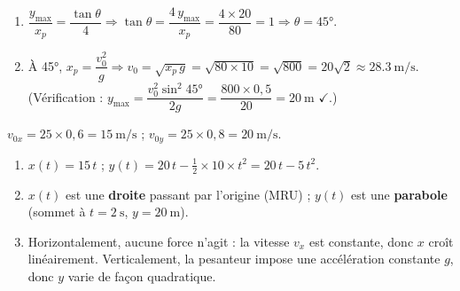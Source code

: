 \documentclass[11pt,a4paper]{article}
\begin{document}
\begin{corrige}
\begin{enumerate}[label=\alph*)]
  \item $\dfrac{y_{\max}}{x_p}=\dfrac{\tan\theta}{4}\Rightarrow \tan\theta=\dfrac{4\,y_{\max}}{x_p}=\dfrac{4\times20}{80}=1 \Rightarrow \theta=\ang{45}$.
  \item À \ang{45}, $x_p=\dfrac{v_0^2}{g}\Rightarrow v_0=\sqrt{x_p\,g}=\sqrt{80\times10}=\sqrt{800}=20\sqrt2\approx\qty{28,3}{\metre\per\second}$.
        (Vérification : $y_{\max}=\dfrac{v_0^2\sin^2\ang{45}}{2g}=\dfrac{800\times0{,}5}{20}=\qty{20}{\metre}$ $\checkmark$.)
\end{enumerate}
\end{corrige}

\begin{corrige}
$v_{0x}=25\times0{,}6=\qty{15}{\metre\per\second}$ ; $v_{0y}=25\times0{,}8=\qty{20}{\metre\per\second}$.
\begin{enumerate}[label=\alph*)]
  \item $x(t)=15\,t$ ; $y(t)=20\,t-\tfrac12\times10\times t^2=20\,t-5\,t^2$.
  \item $x(t)$ est une \textbf{droite} passant par l'origine (MRU) ; $y(t)$ est une \textbf{parabole} (sommet à $t=\qty{2}{\second}$, $y=\qty{20}{\metre}$).
  \item Horizontalement, aucune force n'agit : la vitesse $v_x$ est constante, donc $x$ croît linéairement. Verticalement, la pesanteur impose une accélération constante $g$, donc $y$ varie de façon quadratique.
\end{enumerate}
\end{corrige}
\end{document}
